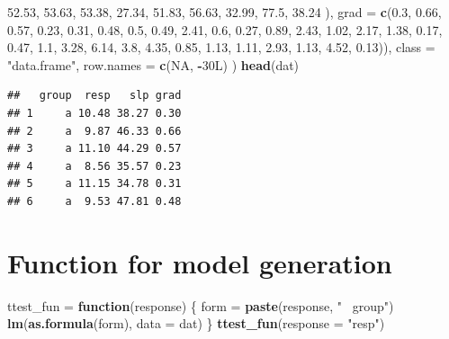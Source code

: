 \documentclass[]{article}
\newenvironment{Shaded}{\begin{snugshade}}{\end{snugshade}}
\newcommand{\KeywordTok}[1]{\textcolor[rgb]{0.13,0.29,0.53}{\textbf{#1}}}
\newcommand{\DataTypeTok}[1]{\textcolor[rgb]{0.13,0.29,0.53}{#1}}
\newcommand{\FloatTok}[1]{\textcolor[rgb]{0.00,0.00,0.81}{#1}}
\newcommand{\StringTok}[1]{\textcolor[rgb]{0.31,0.60,0.02}{#1}}
\newcommand{\OtherTok}[1]{\textcolor[rgb]{0.56,0.35,0.01}{#1}}
\newcommand{\ControlFlowTok}[1]{\textcolor[rgb]{0.13,0.29,0.53}{\textbf{#1}}}
\newcommand{\OperatorTok}[1]{\textcolor[rgb]{0.81,0.36,0.00}{\textbf{#1}}}
\newcommand{\NormalTok}[1]{#1}
\begin{document}
\begin{Shaded}
\begin{Highlighting}[]
    \FloatTok{52.53}\NormalTok{, }\FloatTok{53.63}\NormalTok{, }\FloatTok{53.38}\NormalTok{, }\FloatTok{27.34}\NormalTok{, }\FloatTok{51.83}\NormalTok{, }\FloatTok{56.63}\NormalTok{, }\FloatTok{32.99}\NormalTok{, }\FloatTok{77.5}\NormalTok{, }\FloatTok{38.24}
\NormalTok{    ), }\DataTypeTok{grad =} \KeywordTok{c}\NormalTok{(}\FloatTok{0.3}\NormalTok{, }\FloatTok{0.66}\NormalTok{, }\FloatTok{0.57}\NormalTok{, }\FloatTok{0.23}\NormalTok{, }\FloatTok{0.31}\NormalTok{, }\FloatTok{0.48}\NormalTok{, }\FloatTok{0.5}\NormalTok{, }\FloatTok{0.49}\NormalTok{, }
    \FloatTok{2.41}\NormalTok{, }\FloatTok{0.6}\NormalTok{, }\FloatTok{0.27}\NormalTok{, }\FloatTok{0.89}\NormalTok{, }\FloatTok{2.43}\NormalTok{, }\FloatTok{1.02}\NormalTok{, }\FloatTok{2.17}\NormalTok{, }\FloatTok{1.38}\NormalTok{, }\FloatTok{0.17}\NormalTok{, }\FloatTok{0.47}\NormalTok{, }
    \FloatTok{1.1}\NormalTok{, }\FloatTok{3.28}\NormalTok{, }\FloatTok{6.14}\NormalTok{, }\FloatTok{3.8}\NormalTok{, }\FloatTok{4.35}\NormalTok{, }\FloatTok{0.85}\NormalTok{, }\FloatTok{1.13}\NormalTok{, }\FloatTok{1.11}\NormalTok{, }\FloatTok{2.93}\NormalTok{, }\FloatTok{1.13}\NormalTok{, }
    \FloatTok{4.52}\NormalTok{, }\FloatTok{0.13}\NormalTok{)), }\DataTypeTok{class =} \StringTok{"data.frame"}\NormalTok{, }\DataTypeTok{row.names =} \KeywordTok{c}\NormalTok{(}\OtherTok{NA}\NormalTok{, }\OperatorTok{-}\NormalTok{30L) )}
\KeywordTok{head}\NormalTok{(dat)}
\end{Highlighting}
\end{Shaded}

\begin{verbatim}
##   group  resp   slp grad
## 1     a 10.48 38.27 0.30
## 2     a  9.87 46.33 0.66
## 3     a 11.10 44.29 0.57
## 4     a  8.56 35.57 0.23
## 5     a 11.15 34.78 0.31
## 6     a  9.53 47.81 0.48
\end{verbatim}

\section{Function for model
generation}\label{function-for-model-generation}

\begin{Shaded}
\begin{Highlighting}[]
\NormalTok{ttest_fun =}\StringTok{ }\ControlFlowTok{function}\NormalTok{(response) \{}
\NormalTok{  form =}\StringTok{ }\KeywordTok{paste}\NormalTok{(response, }\StringTok{"~ group"}\NormalTok{)}
  \KeywordTok{lm}\NormalTok{(}\KeywordTok{as.formula}\NormalTok{(form), }\DataTypeTok{data =}\NormalTok{ dat)}
\NormalTok{\}}
\KeywordTok{ttest_fun}\NormalTok{(}\DataTypeTok{response =} \StringTok{"resp"}\NormalTok{)}
\end{Highlighting}
\end{Shaded}
\end{document}
